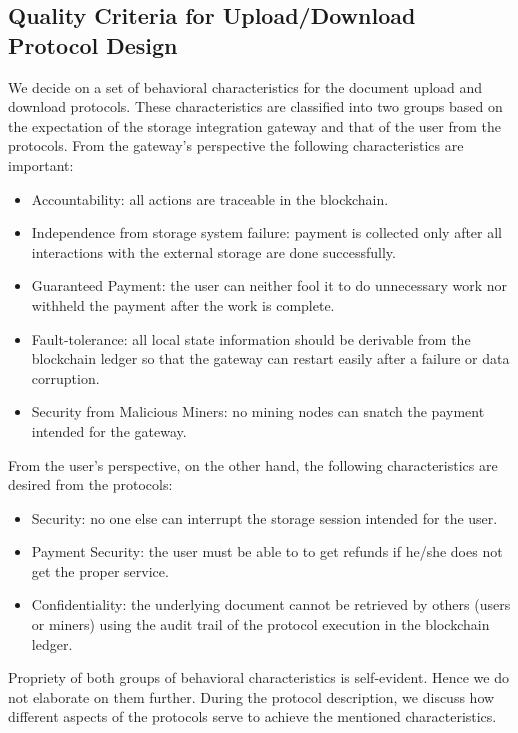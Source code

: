 \subsection{Quality Criteria for Upload/Download Protocol Design}
We decide on a set of behavioral characteristics for the document upload and download protocols. These characteristics are classified into two groups based on the expectation of the storage integration gateway and that of the user from the protocols. 
From the gateway's perspective the following characteristics are important:
\begin{itemize}
\item Accountability: all actions are traceable in the blockchain.
\item Independence from storage system failure: payment is collected only after all interactions with the external storage are done successfully.
\item Guaranteed Payment: the user can neither fool it to do unnecessary work nor withheld the payment after the work is complete.
\item Fault-tolerance: all local state information should be derivable from the blockchain ledger so that the gateway can restart easily after a failure or data corruption.  
\item Security from Malicious Miners: no mining nodes can snatch the payment intended for the gateway. 
\end{itemize}   
From the user's perspective, on the other hand, the following characteristics are desired from the protocols:
\begin{itemize}
\item Security: no one else can interrupt the storage session intended for the user. 
\item Payment Security: the user must be able to to get refunds if he/she does not get the proper service. 
\item Confidentiality: the underlying document cannot be retrieved by others (users or miners) using the audit trail of the protocol execution in the blockchain ledger.
\end{itemize} 
Propriety of both groups of behavioral characteristics is self-evident. Hence we do not elaborate on them further. During the protocol description, we discuss how different aspects of the protocols serve to achieve the mentioned characteristics. 

